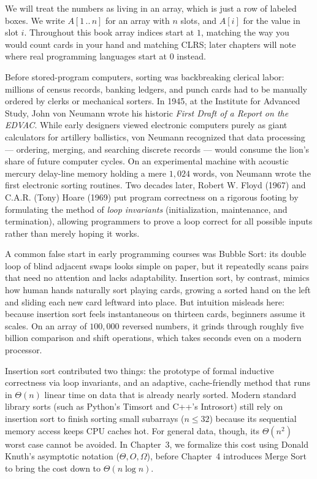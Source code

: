 We will treat the numbers as living in an array, which is just a row of labeled
boxes. We write $A[1\,..\,n]$ for an array with $n$ slots, and $A[i]$ for the value in
slot $i$. Throughout this book array indices start at $1$, matching the way you would
count cards in your hand and matching CLRS; later chapters will note where real
programming languages start at $0$ instead.

\begin{historybox}
Before stored-program computers, sorting was backbreaking clerical labor: millions of census
records, banking ledgers, and punch cards had to be manually ordered by clerks or mechanical
sorters. In 1945, at the Institute for Advanced Study, John von Neumann wrote his historic
\emph{First Draft of a Report on the EDVAC}. While early designers viewed electronic computers purely
as giant calculators for artillery ballistics, von Neumann recognized that data processing ---
ordering, merging, and searching discrete records --- would consume the lion's share of future
computer cycles. On an experimental machine with acoustic mercury delay-line memory holding a mere
$1{,}024$ words, von Neumann wrote the first electronic sorting routines. Two decades later, Robert
W. Floyd (1967) and C.A.R. (Tony) Hoare (1969) put program correctness on a rigorous footing by
formulating the method of \emph{loop invariants} (initialization, maintenance,
and termination), allowing programmers to prove a loop correct for all possible inputs rather than
merely hoping it works.

A common false start in early programming courses was Bubble Sort: its double loop of blind
adjacent swaps looks simple on paper, but it repeatedly scans pairs that need no attention and
lacks adaptability. Insertion sort, by contrast, mimics how human hands naturally sort playing cards,
growing a sorted hand on the left and sliding each new card leftward into place. But intuition
misleads here: because insertion sort feels instantaneous on thirteen cards, beginners assume
it scales. On an array of $100{,}000$ reversed numbers, it grinds through roughly five billion
comparison and shift operations, which takes seconds even on a modern processor.

Insertion sort contributed two things: the prototype of formal inductive correctness via loop
invariants, and an adaptive, cache-friendly method that runs in $\Theta(n)$ linear time on
data that is already nearly sorted. Modern standard library sorts (such as Python's Timsort and C++'s
Introsort) still rely on insertion sort to finish sorting small subarrays ($n \le 32$) because its
sequential memory access keeps CPU caches hot. For general data, though, its
$\Theta(n^2)$ worst case cannot be avoided. In Chapter~3, we formalize this cost using Donald Knuth's asymptotic notation
($\Theta, O, \Omega$), before Chapter~4 introduces Merge Sort to bring the cost down to
$\Theta(n \log n)$.
\end{historybox}

